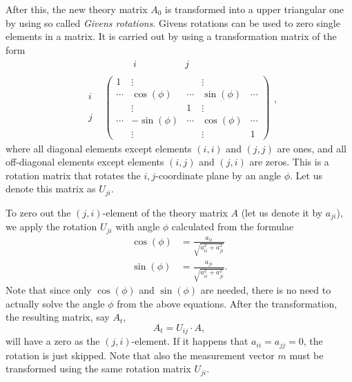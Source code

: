 \documentclass[a4paper,twoside]{refrep}
\begin{document}

After this, the new theory matrix $A_0$ is transformed into a upper triangular one by using so called \emph{Givens rotations}. Givens rotations can be used to zero single elements in a matrix. It is carried out by using a transformation matrix of the form
\[
\begin{matrix}
& \begin{matrix} \phantom{\cdots aa} & i &\phantom{\cdots aaa} &\phantom{aa} j & \phantom{\cdots} \end{matrix} \\
\begin{matrix} \phantom{\vdots} \\ i \\ \phantom{\vdots}\\ j \\ \phantom{\vdots}\end{matrix} &
\begin{pmatrix} 1 & \vdots & \phantom{\cdots} & \vdots & \phantom{\cdots} \\
\cdots & \cos(\phi) & \cdots & \sin(\phi) & \cdots \\
\phantom{\cdots} & \vdots & 1 & \vdots & \phantom{\cdots} \\
\cdots & -\sin(\phi) & \cdots & \cos(\phi) & \cdots \\
\phantom{\cdots} & \vdots & \phantom{\vdots} & \vdots & 1 \end{pmatrix}
\end{matrix},
\]
where all diagonal elements except elements $(i,i)$ and $(j,j)$ are ones, and all off-diagonal elements except elements $(i,j)$ and $(j,i)$ are zeros. This is a rotation matrix that rotates the $i,j$-coordinate plane by an angle $\phi$. Let us denote this matrix as $U_{ji}$.

To zero out the $(j,i)$-element of the theory matrix $A$ (let us denote it by $a_{ji}$), we apply the rotation $U_{ji}$ with angle $\phi$ calculated from the formulae
\begin{eqnarray}
\cos(\phi) &= \frac{a_{ii}}{\sqrt{a_{ii}^2 + a_{ji}^2}}\\
\sin(\phi) &= \frac{a_{ji}}{\sqrt{a_{ii}^2 + a_{ji}^2}}.
\end{eqnarray}
Note that since only $\cos(\phi)$ and $\sin(\phi)$ are needed, there is no need to actually solve the angle $\phi$ from the above equations. After the transformation, the resulting matrix, say $A_t$, 
\begin{equation}
A_t = U_{ij}\cdot A,
\end{equation}
will have a zero as the $(j,i)$-element. If it happens that $a_{ii}=a_{jj}=0$, the rotation is just skipped. Note that also the measurement vector $m$ must be transformed using the same rotation matrix $U_{ji}$.
\end{document}
